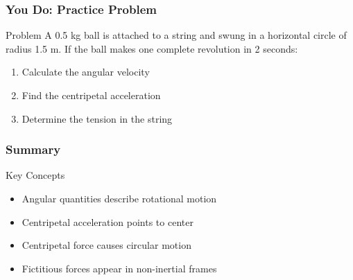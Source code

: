 \documentclass{beamer}
\begin{document}
\begin{frame}
\frametitle{You Do: Practice Problem}
\begin{block}{Problem}
A 0.5 kg ball is attached to a string and swung in a horizontal circle of radius 1.5 m.
If the ball makes one complete revolution in 2 seconds:
\begin{enumerate}
\item Calculate the angular velocity
\item Find the centripetal acceleration
\item Determine the tension in the string
\end{enumerate}
\end{block}
\end{frame}

\begin{frame}
\frametitle{Summary}
\begin{block}{Key Concepts}
\begin{itemize}
\item Angular quantities describe rotational motion
\item Centripetal acceleration points to center
\item Centripetal force causes circular motion
\item Fictitious forces appear in non-inertial frames
\end{itemize}
\end{block}
\end{frame}
\end{document}
